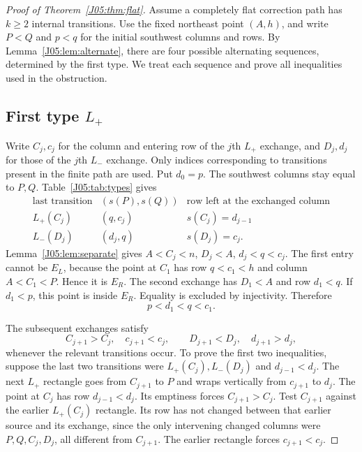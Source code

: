 \documentclass[11pt,oneside]{report}
\theoremstyle{definition}
\numberwithin{equation}{section}
\newcommand{\Lp}{L_+}\newcommand{\Lm}{L_-}
\begin{document}
\begin{proof}[Proof of Theorem~\ref{J05:thm:flat}]
Assume a completely flat correction path has $k\geq2$ internal transitions.
Use the fixed northeast point $(A,h)$, and write $P<Q$ and $p<q$ for the
initial southwest columns and rows. By Lemma~\ref{J05:lem:alternate}, there are
four possible alternating sequences, determined by the first type. We treat
each sequence and prove all inequalities used in the obstruction.

\subsection*{First type $\Lp$}

Write $C_j,c_j$ for the column and entering row of the $j$th $\Lp$ exchange,
and $D_j,d_j$ for those of the $j$th $\Lm$ exchange. Only indices corresponding
to transitions present in the finite path are used. Put $d_0=p$.
The southwest columns stay equal to $P,Q$. Table~\ref{J05:tab:types} gives
\[
 \begin{array}{c|c|c}
 \text{last transition}&(s(P),s(Q))&\text{row left at the exchanged column}\\\hline
 \Lp(C_j)&(q,c_j)&s(C_j)=d_{j-1}\\
 \Lm(D_j)&(d_j,q)&s(D_j)=c_j.
 \end{array}
\]
Lemma~\ref{J05:lem:separate} gives $A<C_j<n$, $D_j<A$, $d_j<q<c_j$.
The first entry cannot be $E_L$, because the point at $C_1$ has row
$q<c_1<h$ and column $A<C_1<P$. Hence it is $E_R$.
The second exchange has $D_1<A$ and row $d_1<q$.
If $d_1<p$, this point is inside $E_R$. Equality is excluded by injectivity.
Therefore
\begin{equation}\label{J05:eq:Lplusinitial}
 p<d_1<q<c_1.
\end{equation}

The subsequent exchanges satisfy
\begin{equation}\label{J05:eq:Lplusrec}
 C_{j+1}>C_j,\quad c_{j+1}<c_j,\qquad
 D_{j+1}<D_j,\quad d_{j+1}>d_j,
\end{equation}
whenever the relevant transitions occur. To prove the first two inequalities,
suppose the last two transitions were $\Lp(C_j),\Lm(D_j)$ and
$d_{j-1}<d_j$. The next $\Lp$ rectangle goes from $C_{j+1}$ to $P$ and wraps
vertically from $c_{j+1}$ to $d_j$. The point at $C_j$ has row
$d_{j-1}<d_j$. Its emptiness forces $C_{j+1}>C_j$.
Test $C_{j+1}$ against the earlier $\Lp(C_j)$ rectangle. Its row has not
changed between that earlier source and its exchange, since the only
intervening changed columns were $P,Q,C_j,D_j$, all different from
$C_{j+1}$. The earlier rectangle forces $c_{j+1}<c_j$.


\end{proof}
\end{document}

